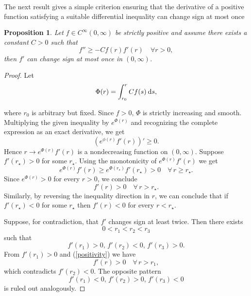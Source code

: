 \documentclass[a4paper,11pt,reqno]{amsart}
\renewcommand\eqref[1]{(\ref{#1})}
\theoremstyle{plain}
\newtheorem{proposition}{Proposition}[section]
\numberwithin{equation}{section} \allowdisplaybreaks
\newcommand{\ds}{\:{\rm d}s}
\begin{document}
The next result gives a simple criterion ensuring that the derivative of a positive function satisfying a suitable differential inequality can change sign at most once
\begin{proposition}\label{monotone}
    Let $f \in C^{\infty}(0,\infty)$ be strictly positive and assume there exists a constant $C>0$ such that 
    \begin{equation*}
        f''\geq -Cf(r)f'(r) \quad \forall r>0,
    \end{equation*}
    then $f'$ can change sign at most once in $(0,\infty)$.
\end{proposition}
\begin{proof}
    Let 
    \begin{equation*}
        \Phi (r)=\int_{r_0}^rCf(s)\ds,
    \end{equation*}

where $r_0$ is arbitrary but fixed. Since $f>0$, $\Phi$ is strictly increasing and smooth. Multiplying the given inequality by $e^{\Phi(r)}$ and recognizing the complete expression as an exact derivative, we get
\begin{equation*}
    \left(e^{\phi(r)}f'(r)\right)' \geq 0.
\end{equation*}
Hence $r \to e^{\Phi(r)}f'(r)$ is a nondecreasing function on $(0,\infty)$.
Suppose $f'(r_{\star})>0$ for some $r_{\star}$. Using the monotonicity of $e^{\Phi(r)}f'(r)$ we get 
\begin{equation*}
    e^{\Phi(r)}f'(r) \geq e^{\Phi(r_{\star})}f'(r_{\star}) >0\quad \forall\, r \geq r_{\star}.
\end{equation*}
Since $e^{\Phi(r)}>0$ for every $r>0$, we conclude
\begin{equation}\label{positivity}
    f'(r)>0\quad \forall\, r> r_{\star}.
\end{equation}
Similarly, by reversing the inequality direction in $r$, we can conclude that if $f'(r_{\star})<0$ for some $r_{\star}$ then $f'(r)<0$ for every $r<r_{\star}$.\par Suppose, for contradiction, that $f'$ changes sign at least twice. Then there exists 
\begin{equation*}
    0<r_1<r_2<r_3
\end{equation*}
such that 
\begin{equation*}
    f'(r_1)>0,\, f'(r_2)<0,\,f'(r_3)>0.
\end{equation*}
From $f'(r_1)>0$ and \eqref{positivity} we have
\begin{equation*}
    f'(r)>0\quad \forall\,r>r_1,
\end{equation*}
which contradicts $f'(r_2)<0$. The opposite pattern
\begin{equation*}
    f'(r_1)<0,\, f'(r_2)>0,\, f'(r_3)<0
\end{equation*}
is ruled out analogously.
\end{proof}
\end{document}
